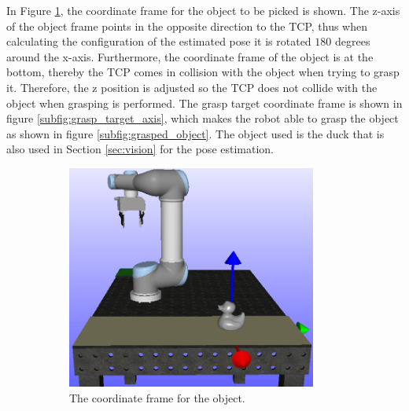 \documentclass[../main.tex]{subfiles}
\begin{document}
In Figure \ref{subfig:duck_axis}, the coordinate frame for the object to be picked is shown. The z-axis of the object frame points in the opposite direction to the TCP, thus when calculating the configuration of the estimated pose it is rotated $180$ degrees around the x-axis. Furthermore, the coordinate frame of the object is at the bottom, thereby the TCP comes in collision with the object when trying to grasp it. Therefore, the z position is adjusted so the TCP does not collide with the object when grasping is performed. The grasp target coordinate frame is shown in figure \ref{subfig:grasp_target_axis}, which makes the robot able to grasp the object as shown in figure \ref{subfig:grasped_object}. The object used is the duck \cite{rubber_duck} that is also used in Section \ref{sec:vision} for the pose estimation.
\begin{figure}[H]
    \centering
    \begin{subfigure}[t]{0.3\textwidth}
        \centering
        \captionsetup{width=0.9\textwidth}
        \includegraphics[width=0.9\textwidth]{figures/combi/duck_axis.png}
        \caption{The coordinate frame for the object.}
        \label{subfig:duck_axis}
    \end{subfigure}
    \begin{subfigure}[t]{0.275\textwidth}
        \centering
        \captionsetup{width=0.9\textwidth}

\end{subfigure}
\end{figure}
\end{document}
